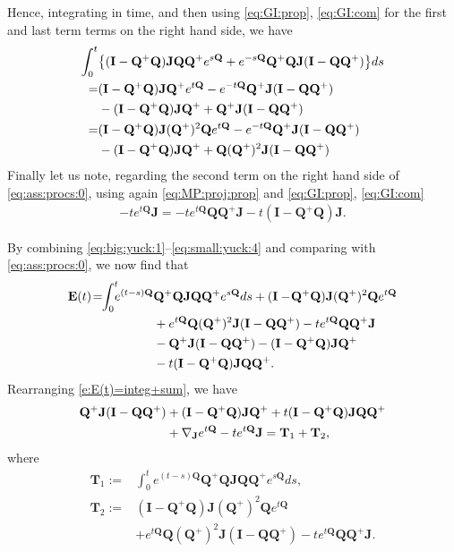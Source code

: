 \documentclass[9pt,twocolumn,twoside]{pnas-new}
\newcommand{\?}{\textbf{?}}
\newcommand{\QQ}{\mathbf{Q}}
\newcommand{\JJ}{\mathbf{J}}
\newcommand{\II}{\mathbf{I}}
\newcommand{\Z}{\mathbf{E}}
\newcommand{\TT}{\mathbf{T}}
\begin{document}
Hence, integrating in time, and then using \eqref{eq:GI:prop},
\eqref{eq:GI:com} for the first and last term terms on the right hand side, we have
\begin{align}
  \int_0^t& \big\{(\II -\QQ^+ \QQ) \JJ \QQ \QQ^{+} e^{s\QQ}
                             + e^{-s\QQ}\QQ^+ \QQ \JJ (\II - \QQ \QQ^{+})\big\}ds
                             \notag\\
   =& (\II -\QQ^+ \QQ) \JJ \QQ^{+}e^{t\QQ}
      - e^{-t\QQ} \QQ^+ \JJ (\II - \QQ \QQ^{+})
      \notag\\
    &- (\II -\QQ^+ \QQ) \JJ \QQ^{+} 
      +  \QQ^+ \JJ (\II - \QQ \QQ^{+})
      \notag\\
   =& (\II -\QQ^+ \QQ) \JJ (\QQ^+)^2 \QQ e^{t\QQ}
      - e^{-t\QQ} \QQ^+ \JJ (\II - \QQ \QQ^{+})
      \notag\\
    &- (\II -\QQ^+ \QQ) \JJ \QQ^{+} 
      + \QQ (\QQ^+)^2 \JJ (\II - \QQ \QQ^{+})
             \label{eq:big:yuck:3}                          
\end{align}
Finally let us note, regarding the second term on the right hand side
of \eqref{eq:ass:procs:0}, using again 
\eqref{eq:MP:proj:prop} and \eqref{eq:GI:prop}, \eqref{eq:GI:com}
\begin{align}
  -te^{t\QQ}\JJ 
  =-te^{t\QQ}\QQ \QQ^+ \JJ  - t (\II - \QQ^+\QQ) \JJ.
               \label{eq:small:yuck:4}                          
\end{align}

By combining \eqref{eq:big:yuck:1}--\eqref{eq:small:yuck:4} and
comparing with \eqref{eq:ass:procs:0}, we now find that
\begin{align}\label{e:E(t)=integ+sum}
  \Z(t)\! =\! \! \int_0^t \! \! \! e^{(t-s)\QQ} &\QQ^+ \QQ \JJ \QQ \QQ^{+} e^{s\QQ}ds
           + (\II - \!\QQ^+ \QQ) \JJ (\QQ^{+})^2\QQ e^{t\QQ}
           \notag\\
           &+ e^{t\QQ} \QQ (\QQ^+)^2 \JJ (\II - \QQ \QQ^{+}) -te^{t\QQ}\QQ \QQ^+ \JJ 
           \notag\\
           &-\QQ^+ \JJ (\II - \QQ \QQ^{+})- (\II -\QQ^+ \QQ) \JJ \QQ^{+}
             \notag\\
         &-t(\II -\QQ^+ \QQ) \JJ \QQ \QQ^{+}.
\end{align}
Rearranging \eqref{e:E(t)=integ+sum}, we have 
\begin{align*}
\QQ^+ \JJ (\II - \QQ \QQ^{+}) &+(\II -\QQ^+ \QQ) \JJ \QQ^{+}
   +t(\II -\QQ^+ \QQ) \JJ \QQ \QQ^{+}
                                \notag\\
  &+  \nabla_\JJ e^{t \QQ} - t  e^{t\QQ} \JJ
  = \TT_1 + \TT_2,
\end{align*}
where 
\begin{align*}
 \TT_1 :=&  \int_0^t  \! \! e^{(t-s)\QQ} \QQ^+ \QQ \JJ \QQ \QQ^{+} e^{s\QQ}ds,\\
  \TT_2 :=&  (\II -\QQ^+ \QQ) \JJ (\QQ^{+})^2\QQ e^{t\QQ}\\
         &+ e^{t\QQ} \QQ (\QQ^+)^2 \JJ (\II - \QQ \QQ^{+}) -te^{t\QQ}\QQ \QQ^+ \JJ.
\end{align*}
\end{document}
